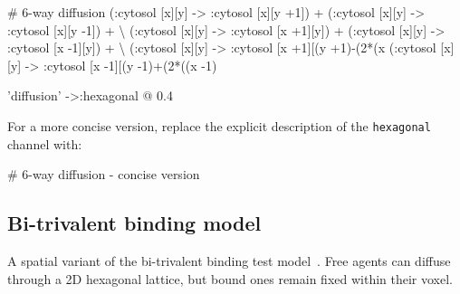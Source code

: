 \documentclass[english]{report}
\begin{document}
\begin{kappasource}


# 6-way diffusion
    (:cytosol [x][y] -> :cytosol [x][y +1]) + (:cytosol [x][y] -> :cytosol [x][y -1]) + {\textbackslash}
    (:cytosol [x][y] -> :cytosol [x +1][y]) + (:cytosol [x][y] -> :cytosol [x -1][y]) + {\textbackslash}
    (:cytosol [x][y] -> :cytosol [x +1][(y +1)-(2*(x%
    (:cytosol [x][y] -> :cytosol [x -1][(y -1)+(2*((x -1)%

'diffusion' ->:hexagonal @ 0.4


\end{kappasource}

For a more concise version, replace the explicit description
of the \Verb+hexagonal+ channel with:

\begin{kappasource}
# 6-way diffusion - concise version
\end{kappasource}


\subsection{Bi-trivalent binding model}
\label{sec:bitrivalent}


A spatial variant of the bi-trivalent binding test model~\citep{yang2008kinetic}. Free agents can diffuse through a 2D hexagonal lattice, but bound ones remain fixed within their voxel.
\end{document}
